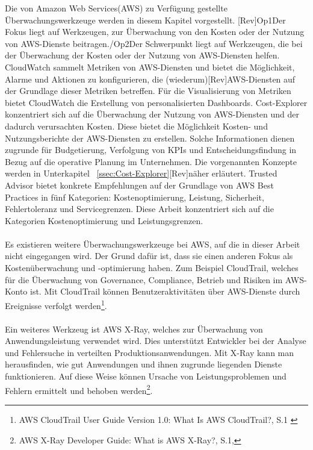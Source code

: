 Die von Amazon Web Services(AWS) zu Verfügung gestellte Überwachungswerkzeuge werden in diesem Kapitel vorgestellt. [Rev]Op1{Der Fokus liegt auf Werkzeugen, zur Überwachung von den Kosten oder der Nutzung von AWS-Dienste beitragen.}/Op2{Der Schwerpunkt liegt auf Werkzeugen, die bei der Überwachung der Kosten oder der Nutzung von AWS-Diensten helfen.}
CloudWatch sammelt Metriken von AWS-Diensten und bietet die Möglichkeit, Alarme und Aktionen zu konfigurieren, die (wiederum)[Rev]AWS-Diensten auf der Grundlage dieser Metriken betreffen. Für die Visualisierung von Metriken bietet CloudWatch die Erstellung von personalisierten Dashboards.
Cost-Explorer konzentriert sich auf die Überwachung der Nutzung von AWS-Diensten und der dadurch verursachten Kosten. Diese bietet die Möglichkeit Kosten- und Nutzungsberichte der AWS-Diensten zu erstellen. Solche Informationen dienen zugrunde für Budgetierung, %
Verfolgung von KPIs und Entscheidungsfindung in Bezug auf die operative Planung im Unternehmen. Die vorgenannten Konzepte werden in Unterkapitel ~\ref{ssec:Cost-Explorer}[Rev]näher erläutert. %
Trusted Advisor bietet konkrete Empfehlungen auf der Grundlage von AWS Best Practices in fünf Kategorien: Kostenoptimierung, Leistung, Sicherheit, Fehlertoleranz und Servicegrenzen. Diese Arbeit konzentriert sich auf die Kategorien Kostenoptimierung und Leistungsgrenzen. 
\\\\
Es existieren weitere Überwachungswerkzeuge bei AWS, auf die in dieser Arbeit nicht eingegangen wird. Der Grund dafür ist, dass sie einen anderen Fokus als Kostenüberwachung und -optimierung haben. Zum Beispiel CloudTrail, welches für die Überwachung von Governance, Compliance, Betrieb und Risiken im AWS-Konto ist. Mit CloudTrail können Benutzeraktivitäten über AWS-Dienste durch Ereignisse verfolgt werden\footnote{AWS CloudTrail User Guide Version 1.0: What Is AWS CloudTrail?, S.1 \cite{AMZ27}}.
\\\\
Ein weiteres Werkzeug ist AWS X-Ray, welches zur Überwachung von Anwendungsleistung verwendet wird. Dies unterstützt Entwickler bei der Analyse und Fehlersuche in verteilten Produktionsanwendungen. Mit X-Ray kann man herausfinden, wie gut Anwendungen und ihnen zugrunde liegenden Dienste funktionieren. Auf diese Weise können Ursache von Leistungsproblemen und Fehlern ermittelt und behoben werden\footnote{AWS X-Ray Developer Guide: What is AWS X-Ray?, S.1\cite{AMZ27},}.
\newpage


